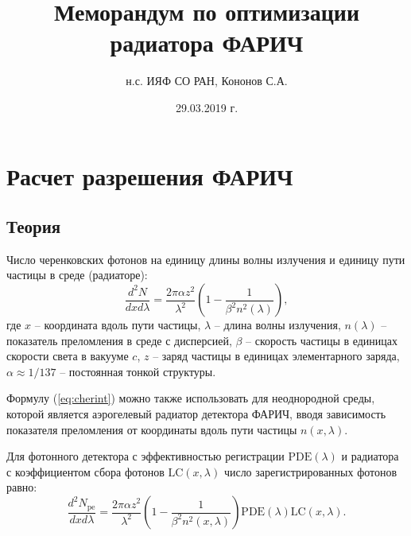 \documentclass[12pt]{article}
\title{\Large\bf Меморандум по оптимизации радиатора ФАРИЧ}
\author{\large н.с. ИЯФ СО РАН, Кононов С.А.}
\date{\large 29.03.2019 г.}
\begin{document}
\maketitle

\section{Расчет разрешения ФАРИЧ}
\subsection{Теория}
Число черенковских фотонов на единицу длины волны излучения и единицу пути частицы в среде (радиаторе):
\begin{equation}
\frac{d^2N}{dx d\lambda} = \frac{2\pi\alpha z^2}{\lambda^2}\left(1 - \frac{1}{\beta^2 n^2(\lambda)}\right),
\label{eq:cherint}
\end{equation}
где $x$ -- координата вдоль пути частицы, $\lambda$ -- длина волны излучения,
$n(\lambda)$ -- показатель преломления в среде с дисперсией,
$\beta$ -- скорость частицы в единицах скорости света в вакууме $c$, $z$ -- заряд частицы в единицах элементарного заряда, 
$\alpha\approx 1/137$ -- постоянная тонкой структуры.

Формулу (\ref{eq:cherint}) можно также использовать для неоднородной среды, которой является аэрогелевый радиатор детектора ФАРИЧ, вводя
зависимость показателя преломления от координаты вдоль пути частицы $n(x,\lambda)$.

Для фотонного детектора с эффективностью регистрации $\mathrm{PDE}(\lambda)$ и радиатора с коэффициентом сбора 
фотонов $\mathrm{LC}(x,\lambda)$ число зарегистрированных фотонов равно:
\begin{equation}
\frac{d^2N_\mathrm{pe}}{dx d\lambda} = \frac{2\pi\alpha z^2}{\lambda^2}\left(1 - \frac{1}{\beta^2 n^2(x,\lambda)}\right)
\mathrm{PDE}(\lambda)\mathrm{LC}(x,\lambda).
\label{eq:cherintdet}
\end{equation}
\end{document}
